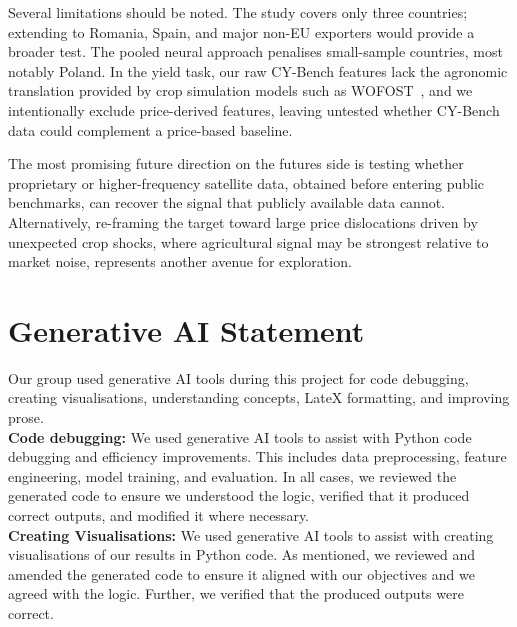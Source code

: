 \documentclass[pdflatex,sn-mathphys-num, oneside, 11pt]{sn-jnl}%
\theoremstyle{thmstyleone}%
\theoremstyle{thmstyletwo}%
\theoremstyle{thmstylethree}%
\begin{document}
Several limitations should be noted. The study covers only three countries; extending to Romania, Spain, and major non-EU exporters would provide a broader test. The pooled neural approach penalises small-sample countries, most notably Poland. In the yield task, our raw CY-Bench features lack the agronomic translation provided by crop simulation models such as WOFOST~\cite{bib16}, and we intentionally exclude price-derived features, leaving untested whether CY-Bench data could complement a price-based baseline.

The most promising future direction on the futures side is testing whether proprietary or higher-frequency satellite data, obtained before entering public benchmarks, can recover the signal that publicly available data cannot. Alternatively, re-framing the target toward large price dislocations driven by unexpected crop shocks, where agricultural signal may be strongest relative to market noise, represents another avenue for exploration.


\clearpage

\section{Generative AI Statement}

Our group used generative AI tools during this project for code debugging, creating visualisations, understanding concepts, LateX formatting, and improving prose.\\

\textbf{Code debugging:} We used generative AI tools to assist with Python code debugging and efficiency improvements. This includes data preprocessing, feature engineering, model training, and evaluation. In all cases, we reviewed the generated code to ensure we understood the logic, verified that it produced correct outputs, and modified it where necessary.\\

\textbf{Creating Visualisations:} We used generative AI tools to assist with creating visualisations of our results in Python code. As mentioned, we reviewed and amended the generated code to ensure it aligned with our objectives and we agreed with the logic. Further, we verified that the produced outputs were correct.\\
\end{document}

